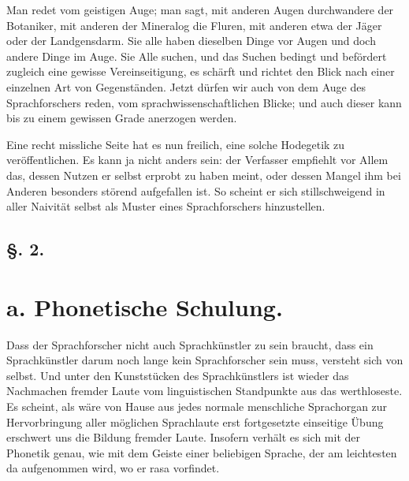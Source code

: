 Man redet vom geistigen Auge; man sagt, mit anderen Augen durchwandere der Botaniker, mit anderen der Mineralog die Fluren, mit anderen etwa der Jäger oder der Landgensdarm. Sie alle haben dieselben Dinge vor Augen und doch andere Dinge im Auge. Sie Alle suchen, und das Suchen bedingt und befördert zugleich eine gewisse Vereinseitigung, es schärft und richtet den Blick nach einer einzelnen Art von Gegenständen. Jetzt dürfen wir auch von dem Auge des \label{fp.32} Sprachforschers reden, vom sprachwissenschaftlichen Blicke; und auch dieser kann bis zu einem gewissen Grade anerzogen werden.

Eine recht missliche Seite hat es nun freilich, eine solche Hodegetik zu veröffentlichen. Es kann ja nicht anders sein: der Verfasser empfiehlt vor Allem das, dessen Nutzen er selbst erprobt zu haben meint, oder dessen Mangel ihm bei Anderen besonders störend aufgefallen ist. So scheint er sich stillschweigend in aller Naivität selbst als Muster eines Sprachforschers hinzustellen.  

\subsection*{§. 2.}\label{I.V.2}
\section*{a. Phonetische Schulung.}

Dass der Sprachforscher nicht auch Sprachkünstler zu sein braucht, dass ein Sprachkünstler darum noch lange kein Sprachforscher sein muss, versteht sich von selbst. Und unter den Kunststücken des Sprachkünstlers ist wieder \label{sp.33} das Nachmachen fremder Laute vom linguistischen Standpunkte aus das werthloseste. Es scheint, als wäre von Hause aus jedes normale menschliche Sprachorgan zur Hervorbringung aller möglichen Sprachlaute  erst fortgesetzte einseitige Übung erschwert uns die Bildung fremder Laute. Insofern verhält es sich mit der Phonetik genau, wie mit dem Geiste einer beliebigen Sprache, der am leichtesten da aufgenommen wird, wo er  rasa vorfindet.


